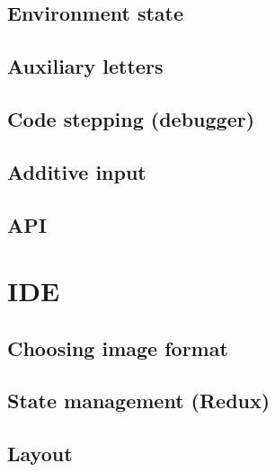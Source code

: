 \subsection{Environment state}

\subsection{Auxiliary letters}

\subsection{Code stepping (debugger)}

\subsection{Additive input}

\subsection{API}

\section{IDE}

\subsection{Choosing image format}

\subsection{State management (Redux)}

\subsection{Layout}